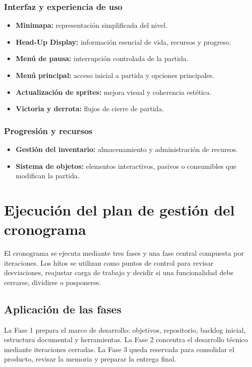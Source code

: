 \subsubsection{Interfaz y experiencia de uso}
\begin{itemize}
    \item \textbf{Minimapa:} representación simplificada del nivel.
    \item \textbf{Head-Up Display:} información esencial de vida, recursos y progreso.
    \item \textbf{Menú de pausa:} interrupción controlada de la partida.
    \item \textbf{Menú principal:} acceso inicial a partida y opciones principales.
    \item \textbf{Actualización de sprites:} mejora visual y coherencia estética.
    \item \textbf{Victoria y derrota:} flujos de cierre de partida.
\end{itemize}

\subsubsection{Progresión y recursos}
\begin{itemize}
    \item \textbf{Gestión del inventario:} almacenamiento y administración de recursos.
    \item \textbf{Sistema de objetos:} elementos interactivos, pasivos o consumibles que
    modifican la partida.
\end{itemize}

\section{Ejecución del plan de gestión del cronograma}
El cronograma se ejecuta mediante tres fases y una fase central compuesta por iteraciones.
Los hitos se utilizan como puntos de control para revisar desviaciones, reajustar carga de
trabajo y decidir si una funcionalidad debe cerrarse, dividirse o posponerse.

\subsection{Aplicación de las fases}
La Fase 1 prepara el marco de desarrollo: objetivos, repositorio, backlog inicial,
estructura documental y herramientas. La Fase 2 concentra el desarrollo técnico mediante
iteraciones cerradas. La Fase 3 queda reservada para consolidar el producto, revisar la
memoria y preparar la entrega final.

